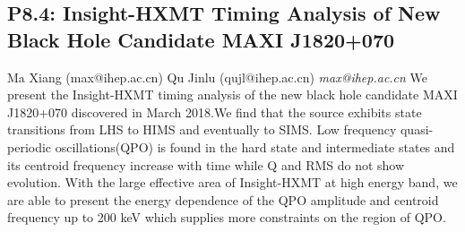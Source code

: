 \documentclass{report}
\begin{document}
\subsection*{P8.4: Insight-HXMT Timing Analysis of New Black Hole Candidate MAXI J1820+070}
\bigskip
Ma Xiang (max@ihep.ac.cn) \newline Qu Jinlu (qujl@ihep.ac.cn) \newline   \newline   \newline  \newline  \newline\newline
{\it max@ihep.ac.cn}\newline
\newline\newline
We present the Insight-HXMT timing analysis of the new black hole candidate MAXI J1820+070 discovered in March 2018.We find that the source  exhibits state transitions from LHS to HIMS and eventually to SIMS.  Low frequency quasi-periodic oscillations(QPO) is found in the hard state and intermediate states and its centroid frequency increase with time while Q and RMS do not show evolution. With the large effective area of Insight-HXMT at high energy band, we are able to present the energy dependence of the QPO amplitude and centroid frequency up to 200 keV which supplies more constraints on the region of QPO.\newline
\newpage
\end{document}
